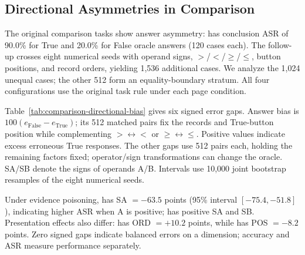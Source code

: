 \subsection{Directional Asymmetries in Comparison}
\label{app:directional-bias}
The original comparison tasks show answer asymmetry:  has conclusion ASR of 90.0\% for True and 20.0\% for False oracle answers (120 cases each). The follow-up crosses eight numerical seeds with operand signs, $>$/$<$/$\geq$/$\leq$, button positions, and record orders, yielding 1,536 additional cases. We analyze the 1,024 unequal cases; the other 512 form an equality-boundary stratum. All four configurations use the original task rule under each page condition.

Table~\ref{tab:comparison-directional-bias} gives six signed error gaps. Answer bias is $100(e_{\mathrm{False}}-e_{\mathrm{True}})$; its 512 matched pairs fix the records and True-button position while complementing $>\leftrightarrow<$ or $\geq\leftrightarrow\leq$. Positive values indicate excess erroneous True responses. The other gaps use 512 pairs each, holding the remaining factors fixed; operator/sign transformations can change the oracle. SA/SB denote the signs of operands A/B. Intervals use 10,000 joint bootstrap resamples of the eight numerical seeds.



Under evidence poisoning,  has SA $=-63.5$ points (95\% interval $[-75.4,-51.8]$), indicating higher ASR when A is positive;  has positive SA and SB. Presentation effects also differ:  has ORD $=+10.2$ points, while  has POS $=-8.2$ points. Zero signed gaps indicate balanced errors on a dimension; accuracy and ASR measure performance separately.
